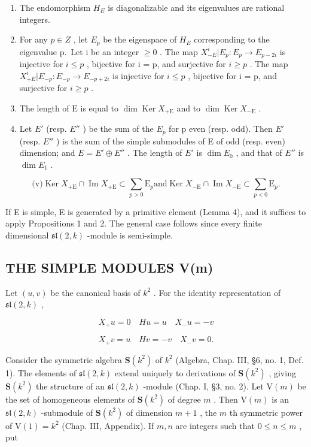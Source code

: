 \begin{enumerate}
\def\labelenumi{(\roman{enumi})}
\item
  The endomorphism \(H_{E}\) is diagonalizable and its eigenvalues are rational integers.
\item
  For any \(p \in Z\) , let \(E_{p}\) be the eigenspace of \(H_{E}\) corresponding to the eigenvalue p.~Let i be an integer \(\geq 0\) . The map \(X_{-E}^{i}|E_{p}:E_{p} \to E_{p-2i}\) is injective for \(i \leq p\) , bijective for i = p, and surjective for \(i \geq p\) . The map \(X_{+E}^{i}|E_{-p}:E_{-p} \to E_{-p+2i}\) is injective for \(i \leq p\) , bijective for i = p, and surjective for \(i \geq p\) .
\item
  The length of \(\mathrm{E}\) is equal to \(\dim \operatorname{Ker} X_{+\mathrm{E}}\) and to \(\dim \operatorname{Ker} X_{-\mathrm{E}}\) .
\item
  Let \(E'\) (resp. \(E''\) ) be the sum of the \(E_{p}\) for p even (resp. odd). Then \(E'\) (resp. \(E''\) ) is the sum of the simple submodules of E of odd (resp. even) dimension; and \(E = E' \oplus E''\) . The length of \(E'\) is \(\dim E_{0}\) , and that of \(E''\) is \(\dim E_{1}\) .
\end{enumerate}

\[
\text {(v)} \operatorname{Ker} X _ {+ \mathrm{E}} \cap \operatorname{Im} X _ {+ \mathrm{E}} \subset \sum_ {p > 0} \mathrm{E} _ {p} \text {and} \operatorname{Ker} X _ {- \mathrm{E}} \cap \operatorname{Im} X _ {- \mathrm{E}} \subset \sum_ {p <   0} \mathrm{E} _ {p}.
\]

If E is simple, E is generated by a primitive element (Lemma 4), and it suffices to apply Propositions 1 and 2. The general case follows since every finite dimensional \(\mathfrak{sl}(2,k)\) -module is semi-simple.

\subsection{THE SIMPLE MODULES V(m)}

Let \((u,v)\) be the canonical basis of \(k^2\) . For the identity representation of \(\mathfrak{sl}(2,k)\) ,

\[
X _ {+} u = 0 \quad H u = u \quad X _ {-} u = - v
\]

\[
X _ {+} v = u \quad H v = - v \quad X _ {-} v = 0.
\]

Consider the symmetric algebra \(\mathbf{S}(k^2)\) of \(k^2\) (Algebra, Chap. III, §6, no. 1, Def. 1). The elements of \(\mathfrak{sl}(2,k)\) extend uniquely to derivations of \(\mathbf{S}(k^2)\) , giving \(\mathbf{S}(k^2)\) the structure of an \(\mathfrak{sl}(2,k)\) -module (Chap. I, §3, no. 2). Let \(\mathrm{V}(m)\) be the set of homogeneous elements of \(\mathbf{S}(k^2)\) of degree \(m\) . Then \(\mathrm{V}(m)\) is an \(\mathfrak{sl}(2,k)\) -submodule of \(\mathbf{S}(k^2)\) of dimension \(m + 1\) , the \(m\) th symmetric power of \(\mathrm{V}(1) = k^2\) (Chap. III, Appendix). If \(m,n\) are integers such that \(0 \leq n \leq m\) , put

